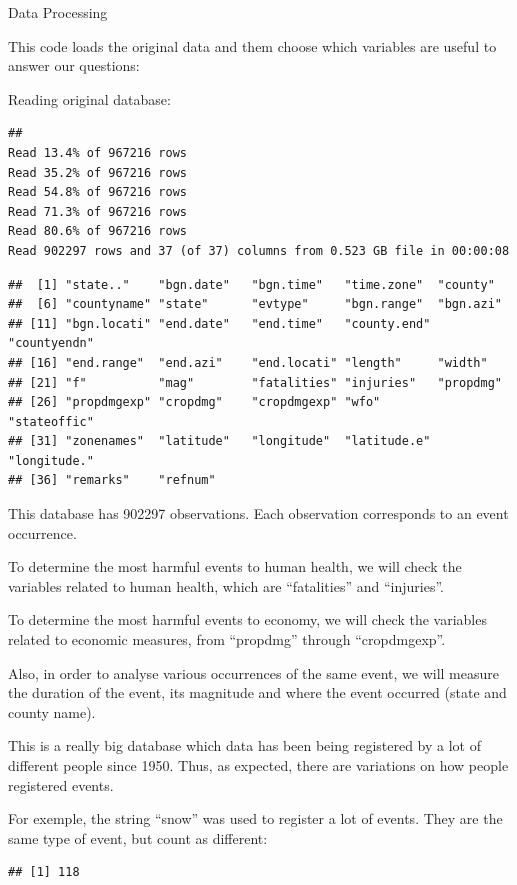 \documentclass[]{article}
\begin{document}
Data Processing

This code loads the original data and them choose which variables are
useful to answer our questions:

Reading original database:

\begin{verbatim}
## 
Read 13.4% of 967216 rows
Read 35.2% of 967216 rows
Read 54.8% of 967216 rows
Read 71.3% of 967216 rows
Read 80.6% of 967216 rows
Read 902297 rows and 37 (of 37) columns from 0.523 GB file in 00:00:08
\end{verbatim}

\begin{verbatim}
##  [1] "state.."    "bgn.date"   "bgn.time"   "time.zone"  "county"    
##  [6] "countyname" "state"      "evtype"     "bgn.range"  "bgn.azi"   
## [11] "bgn.locati" "end.date"   "end.time"   "county.end" "countyendn"
## [16] "end.range"  "end.azi"    "end.locati" "length"     "width"     
## [21] "f"          "mag"        "fatalities" "injuries"   "propdmg"   
## [26] "propdmgexp" "cropdmg"    "cropdmgexp" "wfo"        "stateoffic"
## [31] "zonenames"  "latitude"   "longitude"  "latitude.e" "longitude."
## [36] "remarks"    "refnum"
\end{verbatim}

This database has 902297 observations. Each observation corresponds to
an event occurrence.

To determine the most harmful events to human health, we will check the
variables related to human health, which are ``fatalities'' and
``injuries''.

To determine the most harmful events to economy, we will check the
variables related to economic measures, from ``propdmg'' through
``cropdmgexp''.

Also, in order to analyse various occurrences of the same event, we will
measure the duration of the event, its magnitude and where the event
occurred (state and county name).

This is a really big database which data has been being registered by a
lot of different people since 1950. Thus, as expected, there are
variations on how people registered events.

For exemple, the string ``snow'' was used to register a lot of events.
They are the same type of event, but count as different:

\begin{verbatim}
## [1] 118
\end{verbatim}
\end{document}
